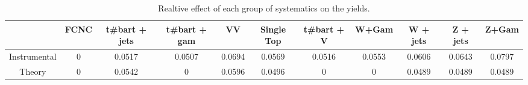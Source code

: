 \begin{table}[htbp]
\begin{center}
\begin{tabular}{|c|c|c|c|c|c|c|c|c|c|c|}
\hline 
      & FCNC      & t#bar{t} + jets      & t#bar{t} +  gam      & VV      & Single Top      & t#bar{t} + V      & W+Gam      & W + jets      & Z + jets      & Z+Gam \\ 
\hline 
 Instrumental & 0 & 0.0517 & 0.0507 & 0.0694 & 0.0569 & 0.0516 & 0.0553 & 0.0606 & 0.0643 & 0.0797 \\ 
 Theory & 0 & 0.0542 & 0 & 0.0596 & 0.0496 & 0 & 0 & 0.0489 & 0.0489 & 0.0489 \\ 
\hline 
\end{tabular} 
\caption{Realtive effect of each group of systematics on the yields.} 
\end{center} 
\end{table} 
